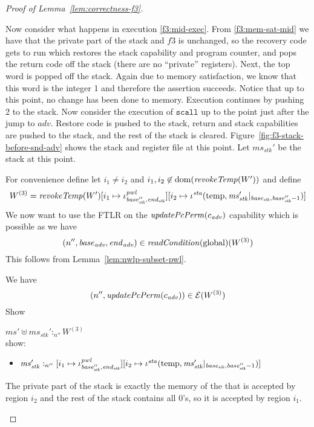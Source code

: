 \documentclass[a4paper]{article}
\newcommand{\update}[2]{[#1 \mapsto #2]}
\DeclareMathOperator{\dom}{dom}
\newcommand{\var}[1]{\mathit{#1}}
\newcommand{\hs}{\var{ms}}
\newcommand{\ms}{\hs}
\newcommand{\start}{\var{base}}
\newcommand{\addrend}{\var{end}}
\newcommand{\heap}{\var{mem}}
\newcommand{\adv}{\var{adv}}
\newcommand{\stk}{\var{stk}}
\newcommand{\pwl}{\var{pwl}}
\newcommand{\sta}{\var{sta}}
\newcommand{\plainfun}[2]{
  \ifthenelse{\equal{#2}{}}
  {\mathit{#1}}
  {\mathit{#1}(#2)}
}
\newcommand{\updatePcPerm}[1]{\plainfun{updatePcPerm}{#1}}
\newcommand{\readCond}[1]{\plainfun{readCondition}{#1}}
\newcommand{\revokeTemp}[1]{\plainfun{revokeTemp}{#1}}
\newcommand{\heapSat}[3][\heap]{#1 :_{#2} #3}
\newcommand{\memSat}[3][n]{\heapSat[#2]{#1}{#3}}
\newcommand{\asmType}{\plaindom{AsmType}}
\newcommand{\plaindom}[1]{\mathrm{#1}}
\newcommand{\intr}[2]{\mathcal{#1}}
\newcommand{\exprintr}[1]{\intr{E}{#1}}
\newcommand{\stder}{\exprintr{\asmType}}
\newcommand{\npair}[2][n]{\left(#1,#2 \right)}
\newcommand{\plainperm}[1]{\mathrm{#1}}
\newcommand{\glob}{\plainperm{global}}
\newcommand{\plainview}[1]{\mathrm{#1}}
\newcommand{\temp}{\plainview{temp}}
\begin{document}
\begin{lemma}
\begin{proof}[Proof of Lemma~\ref{lem:correctness-f3}]
\begin{enumproof}[start=3]
\begin{enumproof}[start=3]
      Now consider what happens in execution \ref{f3:mid-exec}. From \ref{f3:mem-sat-mid} we have that the private part of the stack and $f3$ is unchanged, so the recovery code gets to run which restores the stack capability and program counter, and pops the return code off the stack (there are no ``private'' registers). Next, the top word is popped off the stack. Again due to memory satisfaction, we know that this word is the integer 1 and therefore the assertion succeeds. Notice that up to this point, no change has been done to memory. Execution continues by pushing 2 to the stack. Now consider the execution of $\mathtt{scall}$ up to the point just after the jump to $\adv$. Restore code is pushed to the stack, return and stack capabilities are pushed to the stack, and the rest of the stack is cleared. Figure~\ref{fig:f3-stack-before-snd-adv} shows the stack and register file at this point. Let $\ms_\stk'$ be the stack at this point.

      For convenience define let $i_1 \neq i_2$ and $i_1,i_2 \not\in \dom(\revokeTemp{W'})$ and define
      \[
        W^{(3)} = \revokeTemp{W'}\update{i_1}{\iota^\pwl_{\base_\stk'',\addrend_\stk}}\update{i_2}{\iota^\sta (\temp,\ms_\stk' |_{\start_\stk,\base_\stk''-1})}
      \]
      We now want to use the FTLR on the $\updatePcPerm{c_\adv}$ capability which is possible as we have 
      \[
        \npair[n'']{\start_\adv,\addrend_\adv} \in \readCond{}(\glob)(W^{(3)})
      \]
      This follows from Lemma~\ref{lem:nwlp-subset-pwl}.

      We have 
      \[
        \npair[n'']{\updatePcPerm{c_\adv}} \in \stder(W^{(3)})
      \]
      Show
      \begin{enumproof}[resume]
      \item $\memSat[n'']{\ms' \uplus \ms_\stk'}{W^{(3)}}$ \\
        show:
        \begin{itemize}
        \item $\memSat[n'']{\ms_\stk'}{[i_1 \mapsto \iota^\pwl_{\base_\stk'',\addrend_\stk}][i_2\mapsto \iota^\sta (\temp,\ms_\stk' |_{\start_\stk,\base_\stk''-1})]}$ 
        \end{itemize}
        The private part of the stack is exactly the memory of the that is accepted by region $i_2$ and the rest of the stack contains all 0's, so it is accepted by region $i_1$.


\end{enumproof}
\end{enumproof}
\end{enumproof}
\end{proof}
\end{lemma}
\end{document}
